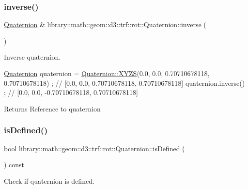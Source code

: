\subsubsection{\texorpdfstring{inverse()}{inverse()}}
{\footnotesize\ttfamily \hyperlink{classlibrary_1_1math_1_1geom_1_1d3_1_1trf_1_1rot_1_1_quaternion}{Quaternion} \& library\+::math\+::geom\+::d3\+::trf\+::rot\+::\+Quaternion\+::inverse (\begin{DoxyParamCaption}{ }\end{DoxyParamCaption})}



Inverse quaternion. 


\begin{DoxyCode}
\hyperlink{classlibrary_1_1math_1_1geom_1_1d3_1_1trf_1_1rot_1_1_quaternion_a1b8794cce68c5ee86dd50f9ba53635fa}{Quaternion} quaternion = \hyperlink{classlibrary_1_1math_1_1geom_1_1d3_1_1trf_1_1rot_1_1_quaternion_a006294eb483bcfc352c2dc36cf19ceec}{Quaternion::XYZS}(0.0, 0.0, 0.70710678118, 0.70710678118) 
      ; \textcolor{comment}{// [0.0, 0.0, 0.70710678118, 0.70710678118]}
quaternion.inverse() ; \textcolor{comment}{// [0.0, 0.0, -0.70710678118, 0.70710678118]}
\end{DoxyCode}


\begin{DoxyReturn}{Returns}
Reference to quaternion 
\end{DoxyReturn}
\mbox{\label{classlibrary_1_1math_1_1geom_1_1d3_1_1trf_1_1rot_1_1_quaternion_adf3d76908b0b95dc3a0310de17ba18b5}} 
\subsubsection{\texorpdfstring{is\+Defined()}{isDefined()}}
{\footnotesize\ttfamily bool library\+::math\+::geom\+::d3\+::trf\+::rot\+::\+Quaternion\+::is\+Defined (\begin{DoxyParamCaption}{ }\end{DoxyParamCaption}) const}



Check if quaternion is defined. 


